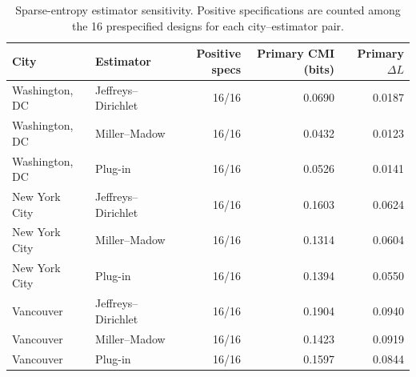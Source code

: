 \begin{table}[!htbp]
\caption{Sparse-entropy estimator sensitivity. Positive specifications are counted among the 16 prespecified designs for each city--estimator pair.}
\label{tab:sup_estimator_specifications}
\centering
\footnotesize
\begin{tabular*}{\linewidth}{@{\extracolsep{\fill}}llrrr@{}}
\toprule
\textbf{City} & \textbf{Estimator} & \textbf{Positive specs} & \textbf{Primary CMI (bits)} & \textbf{Primary $\Delta L$}\\
\midrule
Washington, DC & Jeffreys--Dirichlet & 16/16 & 0.0690 & 0.0187\\
Washington, DC & Miller--Madow & 16/16 & 0.0432 & 0.0123\\
Washington, DC & Plug-in & 16/16 & 0.0526 & 0.0141\\
New York City & Jeffreys--Dirichlet & 16/16 & 0.1603 & 0.0624\\
New York City & Miller--Madow & 16/16 & 0.1314 & 0.0604\\
New York City & Plug-in & 16/16 & 0.1394 & 0.0550\\
Vancouver & Jeffreys--Dirichlet & 16/16 & 0.1904 & 0.0940\\
Vancouver & Miller--Madow & 16/16 & 0.1423 & 0.0919\\
Vancouver & Plug-in & 16/16 & 0.1597 & 0.0844\\
\bottomrule
\end{tabular*}
\end{table}
